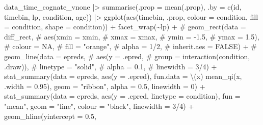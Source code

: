\documentclass[
  letterpaper,
  DIV=11,
  numbers=noendperiod]{scrartcl}
\newenvironment{Shaded}{\begin{snugshade}}{\end{snugshade}}
\newcommand{\AttributeTok}[1]{\textcolor[rgb]{0.40,0.45,0.13}{#1}}
\newcommand{\CommentTok}[1]{\textcolor[rgb]{0.37,0.37,0.37}{#1}}
\newcommand{\DecValTok}[1]{\textcolor[rgb]{0.68,0.00,0.00}{#1}}
\newcommand{\FloatTok}[1]{\textcolor[rgb]{0.68,0.00,0.00}{#1}}
\newcommand{\FunctionTok}[1]{\textcolor[rgb]{0.28,0.35,0.67}{#1}}
\newcommand{\NormalTok}[1]{\textcolor[rgb]{0.00,0.23,0.31}{#1}}
\newcommand{\SpecialCharTok}[1]{\textcolor[rgb]{0.37,0.37,0.37}{#1}}
\newcommand{\StringTok}[1]{\textcolor[rgb]{0.13,0.47,0.30}{#1}}
\begin{document}
\begin{Shaded}
\begin{Highlighting}[]
\NormalTok{data\_time\_cognate\_vnone }\SpecialCharTok{|\textgreater{}} 
    \FunctionTok{summarise}\NormalTok{(}\AttributeTok{.prop =} \FunctionTok{mean}\NormalTok{(.prop),}
              \AttributeTok{.by =} \FunctionTok{c}\NormalTok{(id, timebin, lp, condition, age)) }\SpecialCharTok{|\textgreater{}} 
    \FunctionTok{ggplot}\NormalTok{(}\FunctionTok{aes}\NormalTok{(timebin, .prop, }
               \AttributeTok{colour =}\NormalTok{ condition,}
               \AttributeTok{fill =}\NormalTok{ condition,}
               \AttributeTok{shape =}\NormalTok{ condition)) }\SpecialCharTok{+}
    \FunctionTok{facet\_wrap}\NormalTok{(}\SpecialCharTok{\textasciitilde{}}\NormalTok{lp) }\SpecialCharTok{+}
    \CommentTok{\# geom\_rect(data = diff\_rect,}
    \CommentTok{\#         aes(xmin = xmin,}
    \CommentTok{\#           xmax = xmax,}
    \CommentTok{\#           ymin = {-}1.5,}
    \CommentTok{\#           ymax = 1.5),}
    \CommentTok{\#         colour = NA,}
    \CommentTok{\#         fill = "orange",}
    \CommentTok{\#         alpha = 1/2,}
    \CommentTok{\#         inherit.aes = FALSE) +}
    \CommentTok{\# geom\_line(data = epreds,}
    \CommentTok{\#         aes(y = .epred,}
\CommentTok{\#           group = interaction(condition, .draw)),}
\CommentTok{\#         linetype = "solid",}
\CommentTok{\#         alpha = 0.1,}
\CommentTok{\#         linewidth = 3/4) +}
\FunctionTok{stat\_summary}\NormalTok{(}\AttributeTok{data =}\NormalTok{ epreds,}
             \FunctionTok{aes}\NormalTok{(}\AttributeTok{y =}\NormalTok{ .epred),}
             \AttributeTok{fun.data =}\NormalTok{ \textbackslash{}(x) }\FunctionTok{mean\_qi}\NormalTok{(x, }\AttributeTok{.width =} \FloatTok{0.95}\NormalTok{),}
             \AttributeTok{geom =} \StringTok{"ribbon"}\NormalTok{,}
             \AttributeTok{alpha =} \FloatTok{0.5}\NormalTok{,}
             \AttributeTok{linewidth =} \DecValTok{0}\NormalTok{) }\SpecialCharTok{+}
    \FunctionTok{stat\_summary}\NormalTok{(}\AttributeTok{data =}\NormalTok{ epreds,}
                 \FunctionTok{aes}\NormalTok{(}\AttributeTok{y =}\NormalTok{ .epred,}
                    \AttributeTok{linetype =}\NormalTok{ condition),}
                 \AttributeTok{fun =} \StringTok{"mean"}\NormalTok{,}
                 \AttributeTok{geom =} \StringTok{"line"}\NormalTok{,}
                 \AttributeTok{colour =} \StringTok{"black"}\NormalTok{,}
                 \AttributeTok{linewidth =} \DecValTok{3}\SpecialCharTok{/}\DecValTok{4}\NormalTok{) }\SpecialCharTok{+}
    \FunctionTok{geom\_hline}\NormalTok{(}\AttributeTok{yintercept =} \FloatTok{0.5}\NormalTok{, }

\end{Highlighting}
\end{Shaded}
\end{document}
